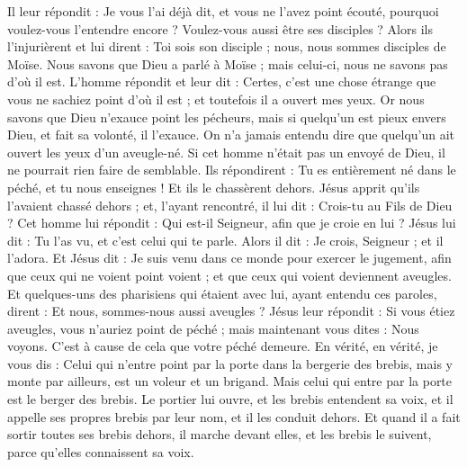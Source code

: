 \begin{multicols}{2}
Il leur répondit : Je vous l'ai déjà dit, et vous ne l'avez point écouté, pourquoi voulez-vous l'entendre encore ? Voulez-vous aussi être ses disciples ?
Alors ils l'injurièrent et lui dirent : Toi sois son disciple ; nous, nous sommes disciples de Moïse.
Nous savons que Dieu a parlé à Moïse ; mais celui-ci, nous ne savons pas d'où il est.
L'homme répondit et leur dit : Certes, c'est une chose étrange que vous ne sachiez point d'où il est ; et toutefois il a ouvert mes yeux.
Or nous savons que Dieu n'exauce point les pécheurs, mais si quelqu'un est pieux envers Dieu, et fait sa volonté, il l'exauce.
On n'a jamais entendu dire que quelqu'un ait ouvert les yeux d'un aveugle-né.
Si cet homme n'était pas un envoyé de Dieu, il ne pourrait rien faire de semblable.
Ils répondirent : Tu es entièrement né dans le péché, et tu nous enseignes ! Et ils le chassèrent dehors.
Jésus apprit qu'ils l'avaient chassé dehors ; et, l'ayant rencontré, il lui dit : Crois-tu au Fils de Dieu ?
Cet homme lui répondit : Qui est-il Seigneur, afin que je croie en lui ?
Jésus lui dit : Tu l'as vu, et c'est celui qui te parle.
Alors il dit : Je crois, Seigneur ; et il l'adora.
Et Jésus dit : Je suis venu dans ce monde pour exercer le jugement, afin que ceux qui ne voient point voient ; et que ceux qui voient deviennent aveugles.
Et quelques-uns des pharisiens qui étaient avec lui, ayant entendu ces paroles, dirent : Et nous, sommes-nous aussi aveugles ?
Jésus leur répondit : Si vous étiez aveugles, vous n'auriez point de péché ; mais maintenant vous dites : Nous voyons. C'est à cause de cela que votre péché demeure.
\VerseOne{}En vérité, en vérité, je vous dis : Celui qui n'entre point par la porte dans la bergerie des brebis, mais y monte par ailleurs, est un voleur et un brigand.
Mais celui qui entre par la porte est le berger des brebis.
Le portier lui ouvre, et les brebis entendent sa voix, et il appelle ses propres brebis par leur nom, et il les conduit dehors.
Et quand il a fait sortir toutes ses brebis dehors, il marche devant elles, et les brebis le suivent, parce qu'elles connaissent sa voix.

\end{multicols}
